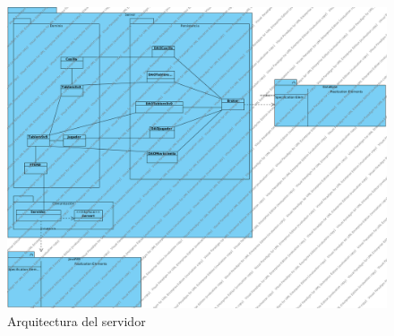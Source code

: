  \begin{figure}[h]
 \centering
 \includegraphics[scale=0.4]{img/arq_Servidor.png}
 \caption{Arquitectura del servidor}
 \label{arq_servidor}
 \end{figure}
 